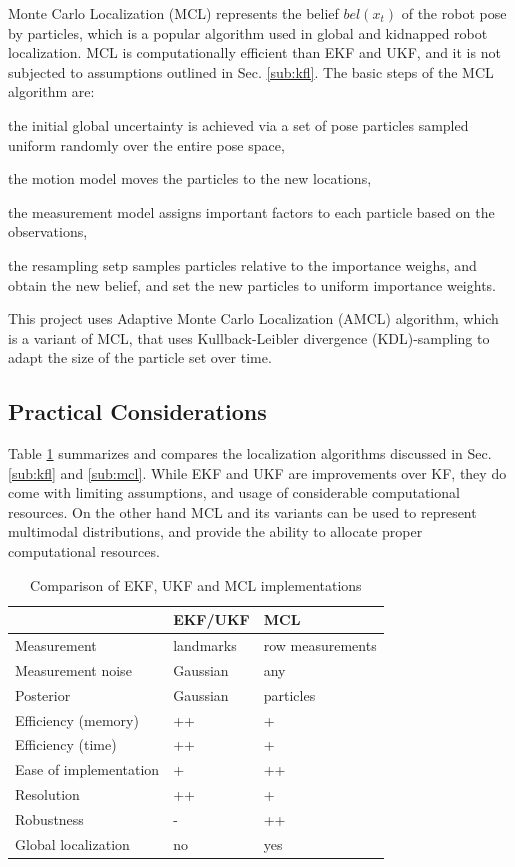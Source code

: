 \documentclass[10pt,journal,compsoc]{IEEEtran}
\begin{document}
Monte Carlo Localization (MCL) represents the belief $bel(x_t)$ of the robot pose by particles, which is a popular algorithm used in global and kidnapped robot localization.  MCL is computationally efficient than EKF and UKF, and it is not subjected to assumptions outlined in Sec. \ref{sub:kfl}. The basic steps of the MCL algorithm are:   \begin{enumerate*} \item the initial global uncertainty is achieved via a set of pose particles sampled uniform randomly over the entire pose space, \item the motion model moves the particles to the new locations, \item the measurement model assigns important factors to each particle based on the observations, \item the resampling setp samples particles relative to the importance weighs, and obtain the new belief, and set the new particles to uniform importance weights.  \end{enumerate*}

This project uses Adaptive Monte Carlo Localization  (AMCL) algorithm, which is a variant of MCL, that uses Kullback-Leibler divergence (KDL)-sampling to adapt the size of the particle set over time. 

\subsection{Practical Considerations}

Table \ref{tab:comp} summarizes and compares the localization algorithms discussed in Sec. \ref{sub:kfl} and \ref{sub:mcl}. While EKF and UKF are improvements over KF, they do come with limiting assumptions, and usage of considerable computational resources. On the other hand MCL and its variants can be used to represent multimodal distributions, and provide the ability to allocate proper computational resources.    

\begin{table}[h]
\caption{Comparison of EKF, UKF and MCL implementations}
\label{tab:comp}
\begin{center}
\begin{tabular}{|l||l|l|}
\hline
& EKF/UKF & MCL\\
\hline
Measurement & landmarks & row measurements\\
Measurement noise  & Gaussian & any\\
Posterior & Gaussian & particles\\
Efficiency (memory) & ++ &+\\
Efficiency (time) & ++ & +\\
Ease of implementation & + & ++\\
Resolution & ++ & +\\
Robustness & - & ++\\
Global localization & no & yes\\
\hline
\end{tabular}
\end{center}
\end{table}
\end{document}
